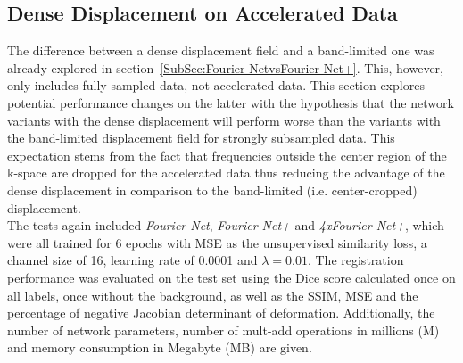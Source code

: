 \documentclass[english,version-2022-01]{uzl-thesis} %
\begin{document}
\subsection{Dense Displacement on Accelerated Data} \label{SubSec:DenseDisplacementAcc}
The difference between a dense displacement field and a band-limited one was already explored in section~\ref{SubSec:Fourier-NetvsFourier-Net+}. This, however, only includes fully sampled data, not accelerated data. This section explores potential performance changes on the latter with the hypothesis that the network variants with the dense displacement will perform worse than the variants with the band-limited displacement field for strongly subsampled data. This expectation stems from the fact that frequencies outside the center region of the k-space are dropped for the accelerated data thus reducing the advantage of the dense displacement in comparison to the band-limited (i.e. center-cropped) displacement. \\
The tests again included \emph{Fourier-Net}, \emph{Fourier-Net+} and \emph{4xFourier-Net+}, which were all trained for 6 epochs with MSE as the unsupervised similarity loss, a channel size of 16, learning rate of 0.0001 and $\lambda=0.01$. The registration performance was evaluated on the test set using the Dice score calculated once on all labels, once without the background, as well as the SSIM, MSE and the percentage of negative Jacobian determinant of deformation. Additionally, the number of network parameters, number of mult-add operations in millions (M) and memory consumption in Megabyte (MB) are given.
\end{document}
